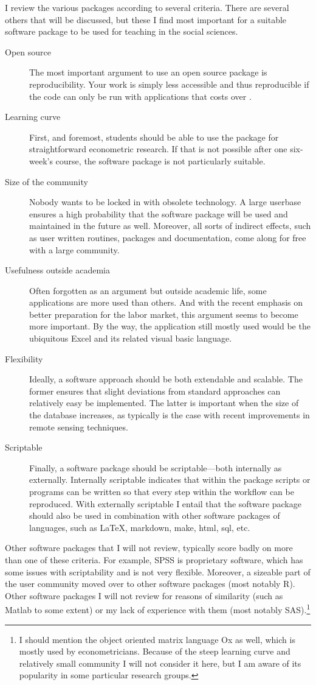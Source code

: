 \documentclass[fleqn,10pt]{SelfArx} %
\begin{document}
I review the various packages according to several criteria. There are several
others that will be discussed, but these I find most important for a suitable
software package to be used for teaching in the social sciences. 
\begin{description}
\item[Open source] The most important argument to use an open source package is
  reproducibility. Your work is simply less accessible and thus reproducible if
  the code can only be run with applications that costs over . 
\item[Learning curve] First, and foremost, students should be able to use the
  package for straightforward econometric research. If that is not possible
  after one six-week's course, the software package is not particularly
  suitable. 
\item[Size of the community] Nobody wants to be locked in with obsolete
  technology. A large userbase ensures a high probability that the software
  package will be used and maintained in the future as well. Moreover, all sorts
  of indirect effects, such as user written routines, packages and
  documentation, come along for free with a large community. 
\item[Usefulness outside academia] Often forgotten as an argument but outside
  academic life, some applications are more used than others. And with the
  recent emphasis on better preparation for the labor market, this argument
  seems to become more important. By the way, the
  application still mostly used would be the ubiquitous Excel and its related
  visual basic language.
\item[Flexibility] Ideally, a software approach should be both extendable and scalable. The former ensures that slight deviations from standard approaches can relatively easy be implemented. The latter is important when the size of the database increases, as typically is the case with recent improvements in remote sensing techniques.
\item[Scriptable] Finally, a software package should be scriptable---both internally as externally. Internally scriptable indicates that within the package scripts or programs can be written so that every step within the workflow can be reproduced. With externally scriptable I entail that the software package should also be used in combination with other software packages of languages, such as \LaTeX, markdown, make, html, sql, etc.
\end{description}
Other software packages that I will not review, typically score badly on more than one of these criteria. For example, SPSS is proprietary software, which has some issues with scriptability and is not very flexible. Moreover, a sizeable part of the user community moved over to other software packages (most notably R). Other software packages I will not review for reasons of similarity (such as Matlab to some extent) or my lack of experience with them (most notably SAS).\footnote{I should mention the object oriented matrix language Ox as well, which is mostly used by econometricians. Because of the steep learning curve and relatively small community I will not consider it here, but I am aware of its popularity in some particular research groups.}
\end{document}
